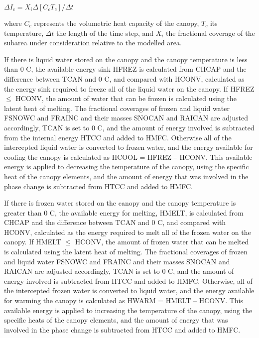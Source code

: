 $\Delta I_c = X_i \Delta [C_c T_c ] / \Delta t$

where $C_c$ represents the volumetric heat capacity of the canopy, $T_c$ its temperature, $\Delta t$ the length of the time step, and $X_i$ the fractional coverage of the subarea under consideration relative to the modelled area.

If there is liquid water stored on the canopy and the canopy temperature is less than 0 C, the available energy sink H\+F\+R\+E\+Z is calculated from C\+H\+C\+A\+P and the difference between T\+C\+A\+N and 0 C, and compared with H\+C\+O\+N\+V, calculated as the energy sink required to freeze all of the liquid water on the canopy. If H\+F\+R\+E\+Z $\leq$ H\+C\+O\+N\+V, the amount of water that can be frozen is calculated using the latent heat of melting. The fractional coverages of frozen and liquid water F\+S\+N\+O\+W\+C and F\+R\+A\+I\+N\+C and their masses S\+N\+O\+C\+A\+N and R\+A\+I\+C\+A\+N are adjusted accordingly, T\+C\+A\+N is set to 0 C, and the amount of energy involved is subtracted from the internal energy H\+T\+C\+C and added to H\+M\+F\+C. Otherwise all of the intercepted liquid water is converted to frozen water, and the energy available for cooling the canopy is calculated as H\+C\+O\+O\+L = H\+F\+R\+E\+Z – H\+C\+O\+N\+V. This available energy is applied to decreasing the temperature of the canopy, using the specific heat of the canopy elements, and the amount of energy that was involved in the phase change is subtracted from H\+T\+C\+C and added to H\+M\+F\+C.

If there is frozen water stored on the canopy and the canopy temperature is greater than 0 C, the available energy for melting, H\+M\+E\+L\+T, is calculated from C\+H\+C\+A\+P and the difference between T\+C\+A\+N and 0 C, and compared with H\+C\+O\+N\+V, calculated as the energy required to melt all of the frozen water on the canopy. If H\+M\+E\+L\+T $\leq$ H\+C\+O\+N\+V, the amount of frozen water that can be melted is calculated using the latent heat of melting. The fractional coverages of frozen and liquid water F\+S\+N\+O\+W\+C and F\+R\+A\+I\+N\+C and their masses S\+N\+O\+C\+A\+N and R\+A\+I\+C\+A\+N are adjusted accordingly, T\+C\+A\+N is set to 0 C, and the amount of energy involved is subtracted from H\+T\+C\+C and added to H\+M\+F\+C. Otherwise, all of the intercepted frozen water is converted to liquid water, and the energy available for warming the canopy is calculated as H\+W\+A\+R\+M = H\+M\+E\+L\+T – H\+C\+O\+N\+V. This available energy is applied to increasing the temperature of the canopy, using the specific heats of the canopy elements, and the amount of energy that was involved in the phase change is subtracted from H\+T\+C\+C and added to H\+M\+F\+C.

